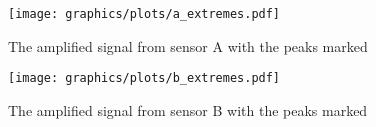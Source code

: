 \documentclass[]{article}
\begin{document}
\begin{figure}[ht!]
  \centering
  \texttt{[image: graphics/plots/a\_extremes.pdf]}
	\caption{The amplified signal from sensor A with the peaks marked}
  \label{fig:a_extremes}
\end{figure}

\begin{figure}[ht!]
  \centering
  \texttt{[image: graphics/plots/b\_extremes.pdf]}
	\caption{The amplified signal from sensor B with the peaks marked}
  \label{fig:b_extremes}
\end{figure}


\end{document}
